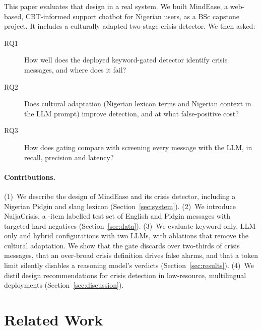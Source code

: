 This paper evaluates that design in a real system. We built MindEase, a web-based, CBT-informed support chatbot for Nigerian users, as a BSc capstone project. It includes a culturally adapted two-stage crisis detector. We then asked:

\begin{description}
  \item[RQ1] How well does the deployed keyword-gated detector identify crisis messages, and where does it fail?
  \item[RQ2] Does cultural adaptation (Nigerian lexicon terms and Nigerian context in the LLM prompt) improve detection, and at what false-positive cost?
  \item[RQ3] How does gating compare with screening every message with the LLM, in recall, precision and latency?
\end{description}

\paragraph{Contributions.} (1)~We describe the design of MindEase and its crisis detector, including a Nigerian Pidgin and slang lexicon (Section~\ref{sec:system}). (2)~We introduce NaijaCrisis, a \Nitems-item labelled test set of English and Pidgin messages with targeted hard negatives (Section~\ref{sec:data}). (3)~We evaluate keyword-only, LLM-only and hybrid configurations with two LLMs, with ablations that remove the cultural adaptation. We show that the gate discards over two-thirds of crisis messages, that an over-broad crisis definition drives false alarms, and that a token limit silently disables a reasoning model's verdicts (Section~\ref{sec:results}). (4)~We distil design recommendations for crisis detection in low-resource, multilingual deployments (Section~\ref{sec:discussion}).

\section{Related Work}


